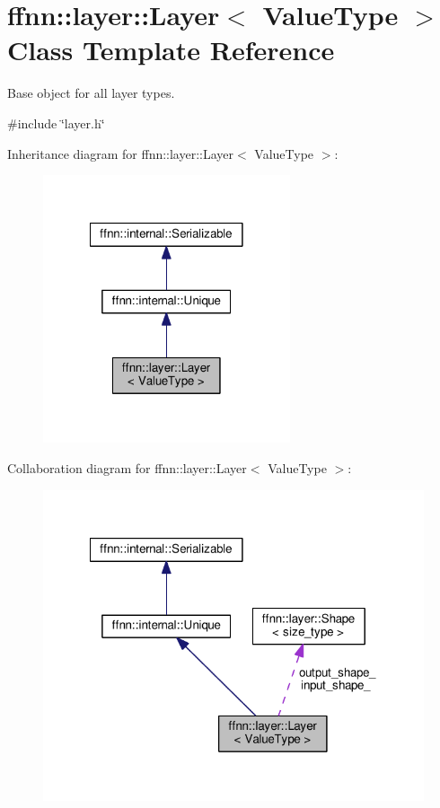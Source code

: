 \hypertarget{classffnn_1_1layer_1_1_layer}{\section{ffnn\-:\-:layer\-:\-:Layer$<$ Value\-Type $>$ Class Template Reference}
\label{classffnn_1_1layer_1_1_layer}
}


Base object for all layer types.  




{\ttfamily \#include \char`\"{}layer.\-h\char`\"{}}



Inheritance diagram for ffnn\-:\-:layer\-:\-:Layer$<$ Value\-Type $>$\-:
\nopagebreak
\begin{figure}[H]
\begin{center}
\leavevmode
\includegraphics[width=206pt]{classffnn_1_1layer_1_1_layer__inherit__graph}
\end{center}
\end{figure}


Collaboration diagram for ffnn\-:\-:layer\-:\-:Layer$<$ Value\-Type $>$\-:\nopagebreak
\begin{figure}[H]
\begin{center}
\leavevmode
\includegraphics[width=318pt]{classffnn_1_1layer_1_1_layer__coll__graph}
\end{center}
\end{figure}

